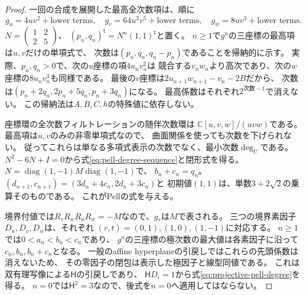 \begin{proof}
一回の合成を展開した最高全次数項は、順に
\[
 g_u=4uv^2+\text{lower terms},\quad
 g_v=64u^2v^5+\text{lower terms},\quad
 g_w=8uv^3+\text{lower terms}.
\]
$N=\left(\begin{smallmatrix}1&2\\2&5\end{smallmatrix}\right)$、
$(p_n,q_n)^{\mathsf t}=N^n(1,1)^{\mathsf t}$と置く。
$n\ge1$で$g^n$の三座標の最高項は$u,v$だけの単項式で、
次数は$(p_n,q_n,q_n-p_n)$であることを帰納的に示す。
実際、$p_n,q_n>0$で、次の$u$座標の項$4u_nv_n^2$は
競合する$v_nw_n$より高次であり、次の$w$座標の$8u_nv_n^3$も同様である。
最後の$v$座標は$2u_{n+1}w_{n+1}-v_n-2B$だから、
次数は$(p_n+2q_n,2p_n+5q_n,p_n+3q_n)$になる。
最高係数はそれぞれ$2^{\text{次数}-1}$で消えない。
この帰納法は$A,B,C,h$の特殊値に依存しない。

座標環の全次数フィルトレーションの随伴次数環は
$\mathbb C[u,v,w]/(uvw)$である。最高項は$u,v$のみの非零単項式なので、
曲面関係を使っても次数を下げられない。
従ってこれらは単なる多項式表示の次数でなく、最小次数$\deg_U$である。
$N^2-6N+I=0$から式\eqref{eq:pell-degree-sequence}と閉形式を得る。
$N=\operatorname{diag}(1,-1)M\operatorname{diag}(1,-1)$で、
$b_n+c_n=q_n$。$(d_{n+1},c_{n+1})=(3d_n+4c_n,2d_n+3c_n)$と
初期値$(1,1)$は、単数$3+2\sqrt2$の乗算そのものである。
これがPellの式を与える。

境界付値では$R_vR_wR_uR_w=-M$なので、$g_*$は$M$で表される。
三つの境界素因子$D_u,D_v,D_w$は、それぞれ
$(r,t)=(0,1),(1,0),(1,-1)$に対応する。
$n\ge1$では$0<a_n<b_n<c_n$であり、
$g^n$の三座標の極次数の最大値は各素因子に沿って
$c_n,b_n,b_n+c_n$となる。
一般のaffine hyperplaneの引戻しではこれらの先頭係数は消えないため、
その零因子の閉包は表示した極因子と線型同値である。
これは双有理写像による$\mathsf H$の引戻しであり、
$\mathsf H D_i=1$から式\eqref{eq:projective-pell-degree}を得る。
$n=0$では$\mathsf H^2=3$なので、後式を$n=0$へ適用してはならない。
\end{proof}

